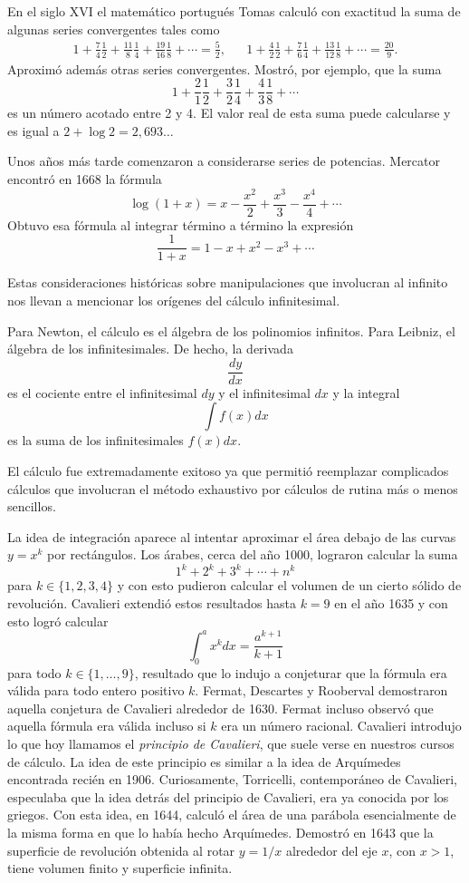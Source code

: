 En el siglo XVI el matemático portugués Tomas calculó con exactitud la suma de
algunas series convergentes tales como 
\begin{align*}
	1+\frac74\frac12+\frac{11}{8}\frac14+\frac{19}{16}\frac18+\cdots = \frac52, && 
	1+\frac42\frac12+\frac76\frac14+\frac{13}{12}\frac18+\cdots=\frac{20}{9}.
\end{align*}
Aproximó además otras series convergentes. Mostró, por ejemplo, que la suma
\[
	1+\frac21\frac12+\frac32\frac14+\frac43\frac18+\cdots
\]
es un número acotado entre 2 y 4. El valor real de esta suma puede calcularse y
es igual a $2+\log 2=2,693\dots$ 

Unos años más tarde comenzaron a considerarse series de potencias. Mercator
encontró en 1668 la fórmula
\[
	\log(1+x)=x-\frac{x^2}{2}+\frac{x^3}{3}-\frac{x^4}{4}+\cdots
\]
Obtuvo esa fórmula al integrar término a término 
la expresión
\[
	\frac{1}{1+x}=1-x+x^2-x^3+\cdots
\]

Estas consideraciones históricas sobre manipulaciones que involucran 
al infinito nos llevan a mencionar los orígenes del cálculo infinitesimal. 

Para Newton, el cálculo es el álgebra de los polinomios infinitos. Para Leibniz, el álgebra de los infinitesimales. De hecho,
la derivada 
\[
	\dfrac{dy}{dx}
\]
es el cociente entre el infinitesimal $dy$ y el infinitesimal $dx$ y la integral 
\[
	\int f(x)dx
\]
es la suma de los infinitesimales $f(x)dx$. 

El cálculo fue extremadamente exitoso ya que permitió reemplazar complicados
cálculos que involucran el método exhaustivo por cálculos de rutina más o menos
sencillos. 

La idea de integración aparece al intentar aproximar el área debajo de las curvas $y=x^k$ 
por rectángulos. Los árabes, cerca del año 1000, lograron calcular la suma
\[
	1^k+2^k+3^k+\cdots+n^k
\]
para $k\in\{1,2,3,4\}$ y con esto pudieron calcular el volumen de un cierto sólido de revolución. 
Cavalieri extendió estos resultados hasta $k=9$ en el año 1635 y con esto logró calcular
\[
	\int_0^a x^kdx=\frac{a^{k+1}}{k+1}
\]
para todo $k\in\{1,\dots,9\}$, resultado que lo indujo a conjeturar que la
fórmula era válida para todo entero positivo $k$. Fermat, Descartes y Rooberval
demostraron aquella conjetura de Cavalieri alrededor de 1630. Fermat incluso
observó que aquella fórmula era válida incluso si $k$ era un número racional.
Cavalieri introdujo lo que hoy llamamos el \emph{principio de Cavalieri}, que
suele verse en nuestros cursos de cálculo. La idea de este principio es similar
a la idea de Arquímedes encontrada recién en 1906. Curiosamente, Torricelli,
contemporáneo de Cavalieri, especulaba que la idea detrás del principio de
Cavalieri, era ya conocida por los griegos. Con esta idea, en 1644, calculó el
área de una parábola esencialmente de la misma forma en que lo había hecho
Arquímedes. Demostró en 1643 que la superficie de revolución obtenida al rotar
$y=1/x$ alrededor del eje $x$, con $x>1$, tiene volumen finito y superficie
infinita.

